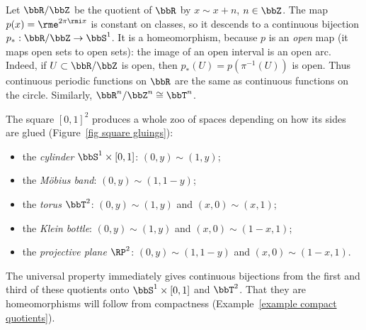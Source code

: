 \begin{example}\label{example circle as quotient}
    Let $\bbR/\bbZ$ be the quotient of $\bbR$ by $x\sim x+n$, $n\in\bbZ$. The map $p(x)=\rme^{2\pi\rmi x}$ is constant on classes, so it descends to a continuous bijection $p_\ast:\bbR/\bbZ\to\bbS^1$. It is a homeomorphism, because $p$ is an \emph{open} map (it maps open sets to open sets): the image of an open interval is an open arc. Indeed, if $U\subset\bbR/\bbZ$ is open, then $p_\ast(U)=p(\pi^{-1}(U))$ is open. Thus continuous periodic functions on $\bbR$ are the same as continuous functions on the circle. Similarly, $\bbR^n/\bbZ^n\cong\bbT^n$.
\end{example}

The square $[0,1]^2$ produces a whole zoo of spaces depending on how its sides are glued (Figure~\ref{fig square gluings}):
\begin{itemize}
    \item the \emph{cylinder} $\bbS^1\times[0,1]$: $(0,y)\sim(1,y)$;
    \item the \emph{M\"obius band}: $(0,y)\sim(1,1-y)$;
    \item the \emph{torus} $\bbT^2$: $(0,y)\sim(1,y)$ and $(x,0)\sim(x,1)$;
    \item the \emph{Klein bottle}: $(0,y)\sim(1,y)$ and $(x,0)\sim(1-x,1)$;
    \item the \emph{projective plane} $\RP^2$: $(0,y)\sim(1,1-y)$ and $(x,0)\sim(1-x,1)$.
\end{itemize}
The universal property immediately gives continuous bijections from the first and third of these quotients onto $\bbS^1\times[0,1]$ and $\bbT^2$. That they are homeomorphisms will follow from compactness (Example~\ref{example compact quotients}).

